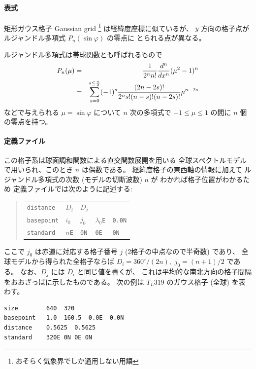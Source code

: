 \paragraph{表式}
矩形ガウス格子 Gaussian grid%
\footnote{おそらく気象界でしか通用しない用語}
は経緯度座標に似ているが、
$y$ 方向の格子点がルジャンドル多項式 $P_n(\sin\varphi)$ の零点に
とられる点が異なる。

ルジャンドル多項式は帯球関数とも呼ばれるもので
\begin{eqnarray}
 P_n(\mu) &=& \frac{1}{2^nn!}\frac{d^n}{dx^n} (\mu^2 - 1)^n
\\
 &=& \sum_{s=0}^{s \le {n\over 2}}
 	(-1)^s
	\frac{(2n - 2s)!}{2^n s! (n - s)! (n - 2s)!}
	\mu^{n - 2s}
\end{eqnarray}
などで与えられる \(\mu = \sin\varphi\) について $n$ 次の多項式で
\(-1 \le \mu \le 1\)
の間に $n$ 個の零点を持つ\cite[第10章]{terakan}。

\paragraph{定義ファイル}
この格子系は球面調和関数による直交関数展開を用いる
全球スペクトルモデルで用いられ、このとき $n$ は偶数である。
経緯度格子の東西軸の情報に加えて
ルジャンドル多項式の次数 (モデルの切断波数) $n$ が
わかれば格子位置がわかるため
定義ファイルでは次のように記述する:
%
\begin{quote}
\begin{tabular}{lllll}
{\tt distance}	& $D_i$ & $D_j$ & & \\
{\tt basepoint}	& $i_0$ & $j_0$	& $\lambda_0${\tt E} & {\tt 0.0N} \\
{\tt standard}	& $n${\tt E} & {\tt 0N} & {\tt 0E} & {\tt 0N} \\
\end{tabular}
\end{quote}
%
ここで $j_0$ は赤道に対応する格子番号 $j$ (2格子の中点なので半奇数)
であり、
全球モデルから得られた全格子ならば
\(
	D_i = 360^\circ/(2n),
\)
\(
	j_0 = (n + 1)/{2}
\)
である。
なお、$D_j$ には $D_i$ と同じ値を書くが、
これは平均的な南北方向の格子間隔をおおざっぱに示したものである。
次の例は $T_L319$ のガウス格子 (全球) を表わす。
\begin{screen}
\begin{verbatim}
size        640  320
basepoint   1.0  160.5  0.0E  0.0N
distance    0.5625  0.5625
standard    320E 0N 0E 0N
\end{verbatim}
\end{screen}

